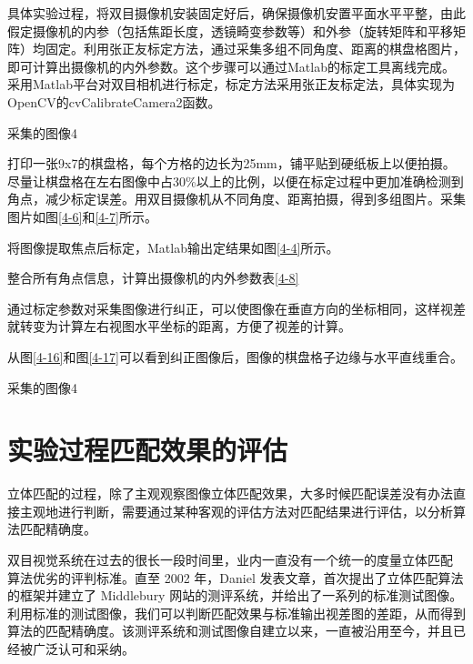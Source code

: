 	
具体实验过程，将双目摄像机安装固定好后，确保摄像机安置平面水平平整，由此假定摄像机的内参（包括焦距长度，透镜畸变参数等）和外参（旋转矩阵和平移矩阵）均固定。利用张正友标定方法，通过采集多组不同角度、距离的棋盘格图片，即可计算出摄像机的内外参数。这个步骤可以通过Matlab的标定工具离线完成。
采用Matlab平台对双目相机进行标定，标定方法采用张正友标定法，具体实现为OpenCV的cvCalibrateCamera2函数。

\begin{pics}[h]{采集的图像}{4}
\end{pics}

打印一张9x7的棋盘格，每个方格的边长为25mm，铺平贴到硬纸板上以便拍摄。尽量让棋盘格在左右图像中占30\%以上的比例，以便在标定过程中更加准确检测到角点，减少标定误差。用双目摄像机从不同角度、距离拍摄，得到多组图片。采集图片如图\ref{4-6}和\ref{4-7}所示。

将图像提取焦点后标定，Matlab输出定结果如图\ref{4-4}所示。


整合所有角点信息，计算出摄像机的内外参数表\ref{4-8}


通过标定参数对采集图像进行纠正，可以使图像在垂直方向的坐标相同，这样视差就转变为计算左右视图水平坐标的距离，方便了视差的计算。

从图\ref{4-16}和图\ref{4-17}可以看到纠正图像后，图像的棋盘格子边缘与水平直线重合。

\begin{pics}[h]{采集的图像}{4}
\end{pics}

\section{实验过程匹配效果的评估}

立体匹配的过程，除了主观观察图像立体匹配效果，大多时候匹配误差没有办法直接主观地进行判断，需要通过某种客观的评估方法对匹配结果进行评估，以分析算法匹配精确度。

双目视觉系统在过去的很长一段时间里，业内一直没有一个统一的度量立体匹配
算法优劣的评判标准。直至 2002 年，Daniel 发表文章，首次提出了立体匹配算法的框架并建立了 Middlebury 网站的测评系统，并给出了一系列的标准测试图像。利用标准的测试图像，我们可以判断匹配效果与标准输出视差图的差距，从而得到算法的匹配精确度。该测评系统和测试图像自建立以来，一直被沿用至今，并且已经被广泛认可和采纳。

